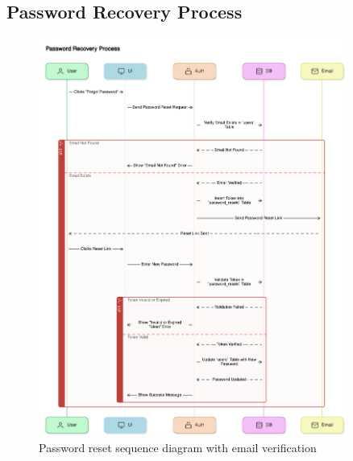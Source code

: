 \subsection{Password Recovery Process}
\begin{figure}[H]
    \centering
    \includegraphics[width=0.9\textwidth]{images/sequence_diagrams/password_recovery_process.png}
    \caption{Password reset sequence diagram with email verification}
    \label{fig:password_recovery}
\end{figure}

